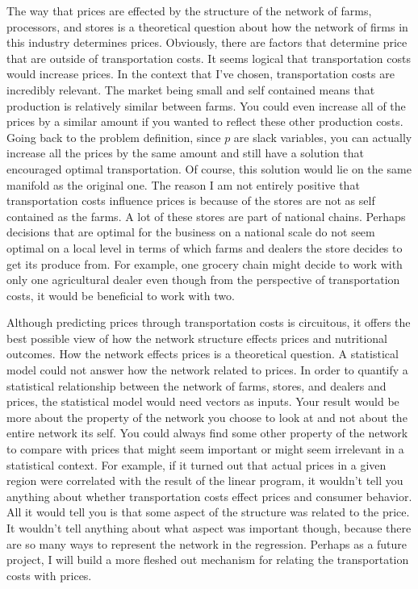 \documentclass{report}
\begin{document}
The way that prices are effected by the structure of the network of farms, processors, and stores is a theoretical question about how the network of firms in this industry determines prices.  Obviously, there are factors that determine price that are outside of transportation costs. It seems logical that transportation costs would increase prices. In the context that I've chosen, transportation costs are incredibly relevant. The market being small and self contained means that production is relatively similar between farms. You could even increase all of the prices by a similar amount if you wanted to reflect these other production costs. Going back to the problem definition, since $p$ are slack variables, you can actually increase all the prices by the same amount and still have a solution that encouraged optimal transportation. Of course, this solution would lie on the same manifold as the original one. The reason I am not entirely positive that transportation costs influence prices is because of the stores are not as self contained as the farms. A lot of these stores are part of national chains. Perhaps decisions that are optimal for the business on a national scale do not seem optimal on a local level in terms of which farms and dealers the store decides to get its produce from. For example, one grocery chain might decide to work with only one agricultural dealer even though from the perspective of transportation costs, it would be beneficial to work with two.

Although predicting prices through transportation costs is circuitous, it offers the best possible view of how the network structure effects prices and nutritional outcomes. How the network effects prices is a theoretical question. A statistical model could not answer how the network related to prices. In order to quantify a statistical relationship between the network of farms, stores, and dealers and prices, the statistical model would need vectors as inputs. Your result would be more about the property of the network you choose to look at and not about the entire network its self. You could always find some other property of the network to compare with prices that might seem important or might seem irrelevant in a statistical context. For example, if it turned out that actual prices in a given region were correlated with the result of the linear program, it wouldn't tell you anything about whether transportation costs effect prices and consumer behavior. All it would tell you is that some aspect of the structure was related to the price. It wouldn't tell anything about what aspect was important though, because there are so many ways to represent the network in the regression. Perhaps as a future project, I will build a more fleshed out mechanism for relating the transportation costs with prices.
\end{document}
